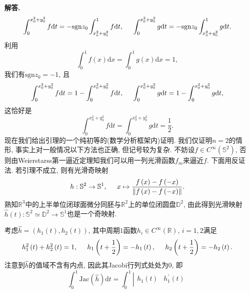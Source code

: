 \documentclass{article}
\newenvironment{solution}{\par\noindent\textbf{解答. }}{\par}
\begin{document}
\begin{solution}
$$
\int_0^{x_{0}^{2}+y_{0}^{2}}{f\mathrm{d}t}=-\mathrm{sgn} z_0\int_{x_{0}^{2}+y_{0}^{2}}^1{f\mathrm{d}t},\hspace{0.5cm}\int_0^{x_{0}^{2}+y_{0}^{2}}{g\mathrm{d}t}=-\mathrm{sgn} z_0\int_{x_{0}^{2}+y_{0}^{2}}^1{g\mathrm{d}t}.
$$
利用
$$
\int_0^1{f\left( x \right) \mathrm{d}x}=\int_0^1{g\left( x \right) \mathrm{d}x}=1,
$$
我们有$\mathrm{sgn}z_0=-1$, 且
$$
\int_0^{x_{0}^{2}+y_{0}^{2}}{f\mathrm{d}t}=1-\int_0^{x_{0}^{2}+y_{0}^{2}}{f\mathrm{d}t},\hspace{0.5cm}\int_0^{x_{0}^{2}+y_{0}^{2}}{g\mathrm{d}t}=1-\int_0^{x_{0}^{2}+y_{0}^{2}}{g\mathrm{d}t},
$$
这恰好是
$$
\int_0^{x_{0}^{2}+y_{0}^{2}}{f\mathrm{d}t}=\int_0^{x_{0}^{2}+y_{0}^{2}}{g\mathrm{d}t}=\frac{1}{2}.
$$
现在我们给出引理的一个纯初等的(数学分析框架内)证明. 我们仅证明$n=2$的情形, 事实上对一般情况以下方法也正确, 但记号较为复杂. 不妨设$f\in C^\infty(\mathbb{S}^2)$, 否则由Weierstarss第一逼近定理知我们可以用一列光滑函数$f_m$来逼近$f$. 下面用反证法. 若引理不成立, 则有光滑奇映射
$$
h:\mathbb{S} ^2\rightarrow \mathbb{S} ^1,\hspace{0.5cm}x\mapsto \frac{f\left( x \right) -f\left( -x \right)}{\left\| f\left( x \right) -f\left( -x \right) \right\|}.
$$
熟知$\mathbb{R}^3$中的上半单位闭球面微分同胚与$\mathbb{R}^2$上的单位闭圆盘$\mathbb{D}^2$, 由此得到光滑映射$\hat{h}\left( t \right) :\mathbb{S} ^2\simeq \mathbb{D} ^2\rightarrow \mathbb{S} ^1$也是一个奇映射.
\begin{center}
\end{center}
考虑$\hat{h}=(h_1(t),h_2(t))$, 其中周期$1$函数$h_i\in C^\infty(\mathbb{R})$, $i=1,2$满足
$$
h_{1}^{2}\left( t \right) +h_{2}^{2}\left( t \right) =1,\hspace{0.5cm}h_1\left( t+\frac{1}{2} \right) =-h_1\left( t \right) ,\hspace{0.5cm}h_2\left( t+\frac{1}{2} \right) =-h_2\left( t \right) .
$$
注意到$\hat{h}$的值域不含有内点, 因此其Jacobi行列式处处为$0$, 即
$$
\int_0^1{\mathrm{Jac}\left( \hat{h} \right) \mathrm{d}t}=\int_0^1{\left| \begin{matrix}
	h_1\left( t \right)&		h_{1}^{\prime}\left( t \right)\\

\end{matrix}}$$
\end{solution}
\end{document}
